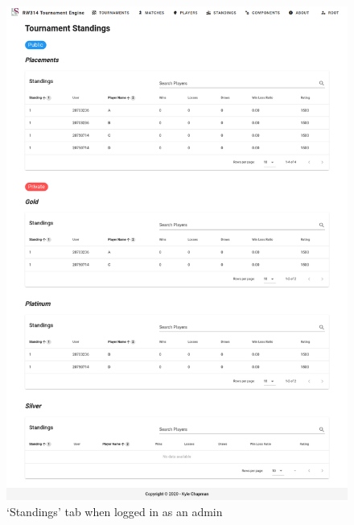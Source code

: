 \documentclass[a4paper, 12pt]{report}
\begin{document}
\begin{figure}[H]
	\centering
	\includegraphics[scale=0.33]{standings-admin.png}
	\caption{`Standings' tab when logged in as an admin}
	\label{fig:standings-admin}
\end{figure}
\end{document}
